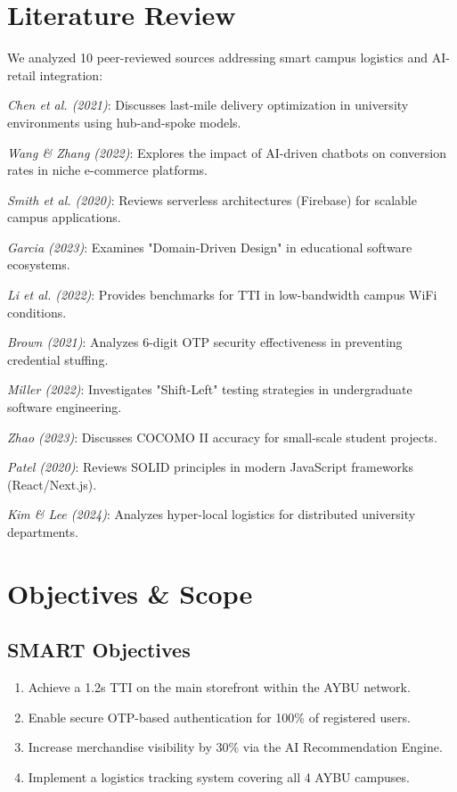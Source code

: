 \documentclass[11pt,a4paper]{article}
\begin{document}
\section{Literature Review}
We analyzed 10 peer-reviewed sources addressing smart campus logistics and AI-retail integration:
\begin{enumerate}[label={[\arabic*]}]
    \item \textit{Chen et al. (2021)}: Discusses last-mile delivery optimization in university environments using hub-and-spoke models.
    \item \textit{Wang \& Zhang (2022)}: Explores the impact of AI-driven chatbots on conversion rates in niche e-commerce platforms.
    \item \textit{Smith et al. (2020)}: Reviews serverless architectures (Firebase) for scalable campus applications.
    \item \textit{Garcia (2023)}: Examines "Domain-Driven Design" in educational software ecosystems.
    \item \textit{Li et al. (2022)}: Provides benchmarks for TTI in low-bandwidth campus WiFi conditions.
    \item \textit{Brown (2021)}: Analyzes 6-digit OTP security effectiveness in preventing credential stuffing.
    \item \textit{Miller (2022)}: Investigates "Shift-Left" testing strategies in undergraduate software engineering.
    \item \textit{Zhao (2023)}: Discusses COCOMO II accuracy for small-scale student projects.
    \item \textit{Patel (2020)}: Reviews SOLID principles in modern JavaScript frameworks (React/Next.js).
    \item \textit{Kim \& Lee (2024)}: Analyzes hyper-local logistics for distributed university departments.
\end{enumerate}

\section{Objectives \& Scope}
\subsection{SMART Objectives}
\begin{enumerate}
    \item Achieve a 1.2s TTI on the main storefront within the AYBU network.
    \item Enable secure OTP-based authentication for 100\% of registered users.
    \item Increase merchandise visibility by 30\% via the AI Recommendation Engine.
    \item Implement a logistics tracking system covering all 4 AYBU campuses.
\end{enumerate}
\end{document}
